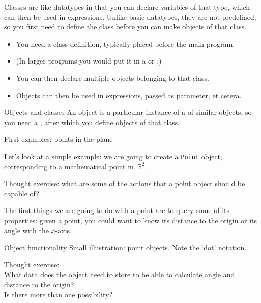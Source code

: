 Classes are like datatypes in that you can declare
variables of that type,
which can then be used in expressions.
Unlike basic datatypes, they are not predefined,
so you first need to define the class before
you can make objects of that class.

\begin{itemize}
\item You need a class definition, typically placed before the main
  program.
\item (In larger programs you would put it in a
   or .)
\item You can then declare multiple objects belonging to that
  class.
\item Objects can then be used in expressions, passed as parameter, et cetera.
\end{itemize}

\begin{slide}{Objects and classes}
  \label{label:class-def}
  An object is a particular instance of a  of
  similar objects, so you need a ,
  after which you define objects of that class.
\end{slide}

 {First examples: points in the plane}

Let's look at a simple example: we are going to create a
\lstinline{Point} object, corresponding to a mathematical point
in~$\mathbb{R}^2$.

\begin{exercise}
  \label{ex:point-what}
  Thought exercise:
  what are some of the actions that a point object
  should be capable of?
\end{exercise}

The first things we are going to do with a point are to
query some of its properties:
given a point, you could want to know its distance to the origin
or its angle with the $x$-axis.

\begin{block}{Object functionality}
  \label{sl:object-functionality}
  Small illustration: point objects.
  Note the `dot' notation. 
\end{block}

\begin{exercise}
  \label{ex:pointdesign}
  Thought exercise:\\
  What data does the object need to store to be able to calculate
  angle and distance to the origin?\\
  Is there more than one possibility?
\end{exercise}

